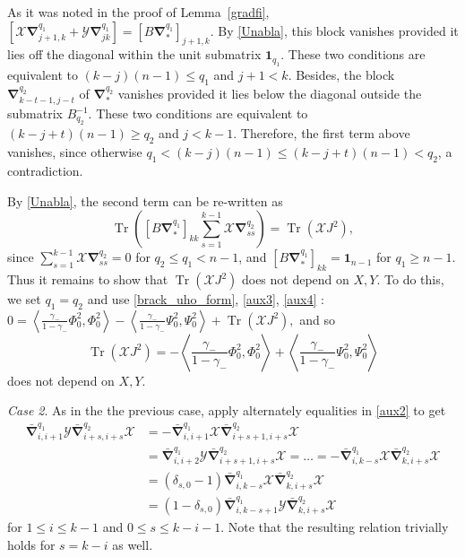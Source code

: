 \documentclass{amsart}
\theoremstyle{definition}
\theoremstyle{remark}
\numberwithin{equation}{section}
\numberwithin{theorem}{section}
\begin{document}
As it was noted in the proof of Lemma~\ref{gradfi}, 
$\left[{{\mathcal X}}{\boldsymbol\nabla}_{j+1,k}^{q_1} + {{\mathcal Y}}{\boldsymbol\nabla}_{jk}^{q_1}\right]=[B{\boldsymbol\nabla}^{q_1}_*]_{j+1,k}$. By \eqref{Unabla},
this block vanishes provided it lies off the diagonal within the unit submatrix ${\mathbf 1}_{q_1}$. These two 
conditions are equivalent to $(k-j)(n-1)\leq q_1$ and $j+1<k$. Besides, the block ${\boldsymbol\nabla}_{k-t-1,j-t}^{q_2}$
of ${\boldsymbol\nabla}^{q_2}_*$ vanishes provided it lies below the diagonal outside the submatrix $B_{q_2}^{-1}$. These 
two conditions are equivalent to $(k-j+t)(n-1)\geq q_2$ and $j<k-1$. Therefore, the first term above vanishes,
since otherwise $q_1<(k-j)(n-1)\leq (k-j+t)(n-1)<q_2$, a contradiction.

By \eqref{Unabla}, the second term can be re-written as 
\[ 
{\operatorname{Tr}}\left(
 [B {\boldsymbol\nabla}^{q_1}_*]_{kk} \sum_{s=1}^{k-1} {{\mathcal X}} {\boldsymbol\nabla}_{ss}^{q_2}\right )
= {\operatorname{Tr}}({{\mathcal X}} J^2),
\]
since  $\sum_{s=1}^{k-1} {{\mathcal X}} {\boldsymbol\nabla}_{ss}^{q_2}=0$ for $q_2\leq q_1 < n-1$,
and $ [B {\boldsymbol\nabla}^{q_1}_*]_{kk}={\mathbf 1}_{n-1}$
for $q_1\geq n-1$.
Thus it remains to show that ${\operatorname{Tr}}({{\mathcal X}} J^2)$ does not depend on $X, Y$. To do this, 
we set $q_1=q_2$ and use \eqref{brack_uho_form}, \eqref{aux3}, \eqref{aux4} :
$
0 =  \left \langle \frac{\gamma_-}{1-\gamma_-}{\Phi}^2_{0}, {\Phi}^2_{0} \right \rangle
-  \left \langle \frac{\gamma_-}{1-\gamma_-}{\Psi}^2_{0}, {\Psi}^2_{0} \right \rangle + {\operatorname{Tr}}({{\mathcal X}} J^2), 
$
and so
\begin{equation}
\label{bad1}
{\operatorname{Tr}}({{\mathcal X}} J^2) = - \left \langle \frac{\gamma_-}{1-\gamma_-}{\Phi}^2_{0}, {\Phi}^2_{0} \right \rangle
+ \left \langle \frac{\gamma_-}{1-\gamma_-}{\Psi}^2_{0}, {\Psi}^2_{0} \right \rangle
\end{equation}
does not depend on $X, Y$.

{\em Case 2}. As in the the previous case, apply alternately equalities in \eqref{aux2} to get
\begin{equation*}
\begin{aligned}
 \bar{\boldsymbol\nabla}_{i,i+1}^{q_1} {{\mathcal Y}} \bar{\boldsymbol\nabla}_{i+s,i+s}^{q_2}
{{\mathcal X}}&=-\bar{\boldsymbol\nabla}_{i,i+1}^{q_1} {{\mathcal X}} \bar{\boldsymbol\nabla}_{i+s+1,i+s}^{q_2} 
 {{\mathcal X}}\\
 &=\bar{\boldsymbol\nabla}_{i,i+2}^{q_1} {{\mathcal Y}} \bar{\boldsymbol\nabla}_{i+s+1,i+s}^{q_2} {{\mathcal X}}=\ldots=
-\bar{\boldsymbol\nabla}_{i,k-s}^{q_1} {{\mathcal X}} \bar{\boldsymbol\nabla}_{k,i+s}^{q_2} {{\mathcal X}}\\
&=(\delta_{s,0}-1)\bar{\boldsymbol\nabla}_{i,k-s}^{q_1} {{\mathcal X}}  \bar{\boldsymbol\nabla}_{k,i+s}^{q_2} {{\mathcal X}}\\ &
=(1-\delta_{s,0})
\bar{\boldsymbol\nabla}_{i,k-s+1}^{q_1} {{\mathcal Y}} \bar{\boldsymbol\nabla}_{k,i+s}^{q_2} {{\mathcal X}}
\end{aligned}
\end{equation*}
for $1\leq i\leq k-1$ and $0\leq s \leq k-i-1$. Note that the resulting relation trivially holds for $s=k-i$ as well.  
\end{document}
